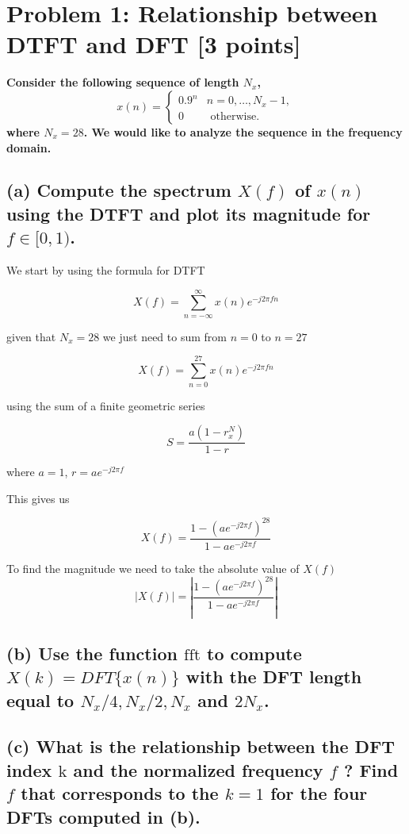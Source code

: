 \section{Problem 1: Relationship between DTFT and DFT [3 points]}
\textbf{Consider the following sequence of length $N_x$,}
$$
x(n)= \begin{cases}0.9^n & n=0, \ldots, N_x-1, \\ 0 & \text { otherwise. }\end{cases}
$$
\textbf{where $N_x=28$. We would like to analyze the sequence in the frequency domain.}
\subsection*{(a) Compute the spectrum $X(f)$ of $x(n)$ using the DTFT and plot its magnitude for $f \in[0,1)$.}

We start by using the formula for DTFT

$$X(f)=\sum_{n=-\infty}^{\infty}x(n)e^{-j2\pi fn}$$

given that $N_x=28$ we just need to sum from $n=0$ to $n=27$

$$X(f)=\sum_{n=0}^{27}x(n)e^{-j2\pi fn}$$

using the sum of a finite geometric series

$$S=\frac{a\left(1-r^N_x\right)}{1-r}$$

where $a=1$, $r=ae^{-j2\pi f}$

This gives us

$$X(f)=\frac{1-\left(ae^{-j2\pi f}\right)^{28}}{1-ae^{-j2\pi f}}$$

To find the magnitude we need to take the absolute value of $X(f)$
$$|X(f)|=|\frac{1-\left(ae^{-j2\pi f}\right)^{28}}{1-ae^{-j2\pi f}}|$$

\importimagewcaption{1a.png}{The magnitude of $X(f)$ for $f \in[0,1)$}

\subsection*{(b) Use the function $\mathrm{fft}$ to compute $X(k)=D F T\{x(n)\}$ with the DFT length equal to $N_x / 4, N_x / 2, N_x$ and $2 N_x$.}




\subsection*{(c) What is the relationship between the DFT index $\mathrm{k}$ and the normalized frequency $f$ ? Find $f$ that corresponds to the $k=1$ for the four DFTs computed in (b).}

